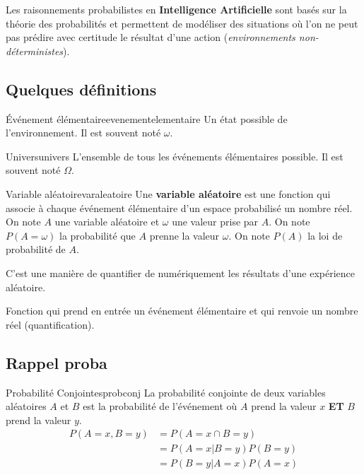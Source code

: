 Les raisonnements probabilistes en \textbf{Intelligence Artificielle} sont basés sur la théorie 
des probabilités et permettent de modéliser des situations 
où l'on ne peut pas prédire avec certitude le résultat d'une action (\textit{environnements non-déterministes}).

\subsection{Quelques définitions} %
\label{sub:quelques_definitions}


\begin{definition}{Événement élémentaire}{evenementelementaire}
    Un état possible de l'environnement. 
    Il est souvent noté $\omega$.
\end{definition}

\begin{definition}{Univers}{univers}
    L'ensemble de tous les événements élémentaires possible.
    Il est souvent noté $\Omega$.
\end{definition}

\begin{definition}{Variable aléatoire}{varaleatoire}
    Une \textbf{variable aléatoire} est une fonction qui associe à chaque événement élémentaire 
    d'un espace probabilisé un nombre réel. 
    On note $A$ une variable aléatoire et $\omega$ une valeur prise par $A$. 
    On note $P(A=\omega)$ la probabilité que $A$ prenne la valeur $\omega$. 
    On note $P(A)$ la loi de probabilité de $A$. 
\end{definition}

\begin{remark}\leavevmode
    C'est une manière de quantifier de numériquement les résultats d'une expérience aléatoire.

    Fonction qui prend en entrée un événement élémentaire et qui renvoie un nombre réel (quantification).
\end{remark}


\subsection{Rappel proba} %
\label{sub:rappel_proba}

\begin{definition}{Probabilité Conjointes}{probconj}
    La probabilité conjointe de deux variables aléatoires $A$ et $B$ est la probabilité de l'événement 
    où $A$ prend la valeur $x$ \textbf{ET} $B$ prend la valeur $y$.
    \begin{align*}
        P(A=x , B=y) &= P(A=x \cap B=y) \\ 
                    &= P(A=x | B=y)P(B=y) \\ 
                    &= P(B=y | A=x)P(A=x)
    \end{align*}
\end{definition}

